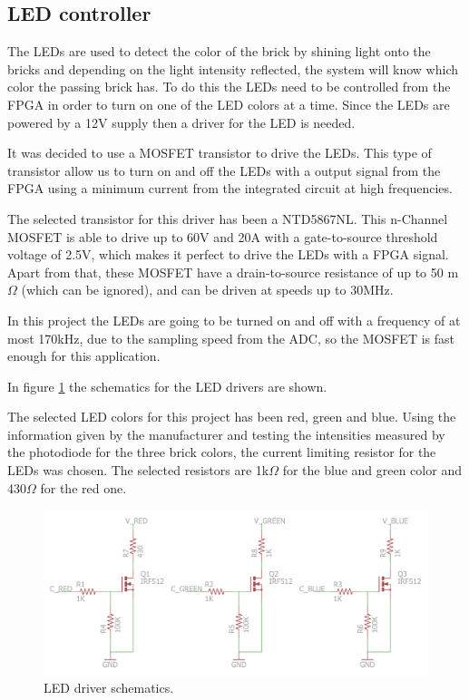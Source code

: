 

\subsection{LED controller}
The LEDs are used to detect the color of the brick by shining light onto the bricks and depending on the light intensity reflected, the system will know which color the passing brick has.
To do this the LEDs need to be controlled from the FPGA in order to turn on one of the LED colors at a time.
Since the LEDs are powered by a 12V supply then a driver for the LED is needed. 

It was decided to use a MOSFET transistor to drive the LEDs. 
This type of transistor allow us to turn on and off the LEDs with a output signal from the FPGA using a minimum current from the integrated circuit at high frequencies.

The selected transistor for this driver has been a NTD5867NL. 
This n-Channel MOSFET is able to drive up to 60V and 20A with a gate-to-source threshold voltage of 2.5V, which makes it perfect to drive the LEDs with a FPGA signal.
Apart from that, these MOSFET have a drain-to-source resistance of up to 50 m$\Omega$ (which can be ignored), and can be driven at speeds up to 30MHz.

In this project the LEDs are going to be turned on and off with a frequency of at most 170kHz, due to the sampling speed from the ADC, so the MOSFET is fast enough for this application.

In figure \ref{fig:LED_driver_sch} the schematics for the LED drivers are shown.

The selected LED colors for this project has been red, green and blue. 
Using the information given by the manufacturer and testing the intensities measured by the photodiode for the three brick colors, the current limiting resistor for the LEDs was chosen. 
The selected resistors are 1k$\Omega$ for the blue and green color and 430$\Omega$ for the red one.

\begin{figure}[H]
\centering 
\includegraphics[width = 0.7 \textwidth]{images/leddriver_schematics}
\caption{LED driver schematics.}
\label{fig:LED_driver_sch}
\end{figure}


